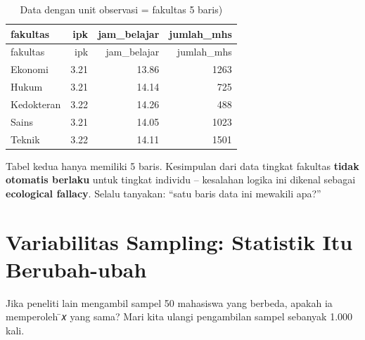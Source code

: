 \documentclass[
  indonesian,
  letterpaper,
]{book}
\newenvironment{Shaded}{\begin{snugshade}}{\end{snugshade}}
\newcommand{\AttributeTok}[1]{\textcolor[rgb]{0.40,0.45,0.13}{#1}}
\newcommand{\DecValTok}[1]{\textcolor[rgb]{0.68,0.00,0.00}{#1}}
\newcommand{\FunctionTok}[1]{\textcolor[rgb]{0.28,0.35,0.67}{#1}}
\newcommand{\NormalTok}[1]{\textcolor[rgb]{0.00,0.23,0.31}{#1}}
\newcommand{\OtherTok}[1]{\textcolor[rgb]{0.00,0.23,0.31}{#1}}
\newcommand{\SpecialCharTok}[1]{\textcolor[rgb]{0.37,0.37,0.37}{#1}}
\newcommand{\StringTok}[1]{\textcolor[rgb]{0.13,0.47,0.30}{#1}}
\begin{document}
\begin{Shaded}
\end{Shaded}

\begin{longtable}[]{@{}lrrr@{}}
\caption{Data dengan unit observasi = fakultas 5 baris)}\tabularnewline
\toprule\noalign{}
fakultas & ipk & jam\_belajar & jumlah\_mhs \\
\midrule\noalign{}
\endfirsthead
\toprule\noalign{}
fakultas & ipk & jam\_belajar & jumlah\_mhs \\
\midrule\noalign{}
\endhead
\bottomrule\noalign{}
\endlastfoot
Ekonomi & 3.21 & 13.86 & 1263 \\
Hukum & 3.21 & 14.14 & 725 \\
Kedokteran & 3.22 & 14.26 & 488 \\
Sains & 3.21 & 14.05 & 1023 \\
Teknik & 3.22 & 14.11 & 1501 \\
\end{longtable}

Tabel kedua hanya memiliki 5 baris. Kesimpulan dari data tingkat
fakultas \textbf{tidak otomatis berlaku} untuk tingkat individu --
kesalahan logika ini dikenal sebagai \textbf{ecological fallacy}. Selalu
tanyakan: ``satu baris data ini mewakili apa?''

\section{Variabilitas Sampling: Statistik Itu
Berubah-ubah}\label{variabilitas-sampling-statistik-itu-berubah-ubah}

Jika peneliti lain mengambil sampel 50 mahasiswa yang berbeda, apakah ia
memperoleh ̄𝑥 yang sama? Mari kita ulangi pengambilan sampel sebanyak
1.000 kali.
\end{document}
